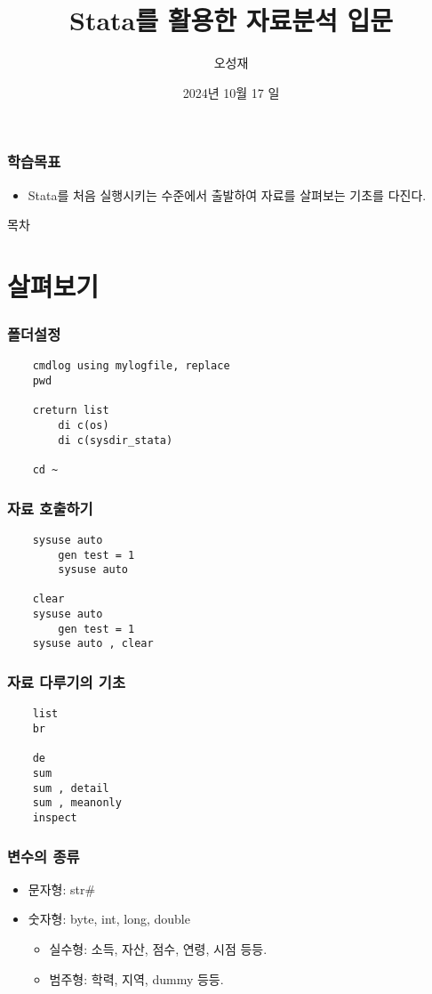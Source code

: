 \documentclass[aspectratio=169,xcolor=dvipsnames,handout]{beamer}
\title{Stata를 활용한 자료분석 입문}
\subtitle{}
\author{오성재}
\institute[CNU]
{\relax
    전북대학교 Stata 특강\
}
\date{2024년 10월 17 일}
\begin{document}

\frame{\titlepage}

\begin{frame}
\frametitle{학습목표}
    \begin{itemize}[<+->]
    \item Stata를 처음 실행시키는 수준에서 출발하여 자료를 살펴보는 기초를 다진다.
    \end{itemize}
\end{frame}

\begin{frame}{목차}
    \small
    \tableofcontents[hideallsubsections]
\end{frame}

\section{살펴보기}

\begin{frame}[fragile]
\frametitle{폴더설정}
    \begin{verbatim}
    cmdlog using mylogfile, replace
    pwd

    creturn list
        di c(os)
        di c(sysdir_stata)

    cd ~
    \end{verbatim}
\end{frame}

\begin{frame}[fragile]
    \frametitle{자료 호출하기}
    \begin{verbatim}
    sysuse auto
        gen test = 1
        sysuse auto

    clear
    sysuse auto
        gen test = 1
    sysuse auto , clear
    \end{verbatim}
\end{frame}

\begin{frame}[fragile]
    \frametitle{자료 다루기의 기초}
    \begin{verbatim}
    list
    br
    
    de
    sum
    sum , detail
    sum , meanonly
    inspect
    \end{verbatim}
\end{frame}

\begin{frame}[allowframebreaks]
    \frametitle{변수의 종류}
    \begin{itemize}[<+->]
        \item 문자형: str\#
        \item 숫자형: byte, int, long, double
        \begin{itemize}[<+->]
            \item 실수형: 소득, 자산, 점수, 연령, 시점 등등.
            \item 범주형: 학력, 지역, dummy 등등.
        \end{itemize}
    \end{itemize}
\end{frame}
\end{document}
